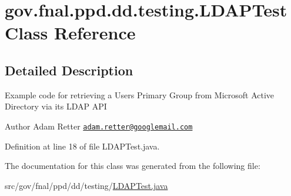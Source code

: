 \hypertarget{classgov_1_1fnal_1_1ppd_1_1dd_1_1testing_1_1LDAPTest}{\section{gov.\-fnal.\-ppd.\-dd.\-testing.\-L\-D\-A\-P\-Test Class Reference}
\label{classgov_1_1fnal_1_1ppd_1_1dd_1_1testing_1_1LDAPTest}
}


\subsection{Detailed Description}
Example code for retrieving a Users Primary Group from Microsoft Active Directory via its L\-D\-A\-P A\-P\-I

\begin{DoxyAuthor}{Author}
Adam Retter \href{mailto:adam.retter@googlemail.com}{\tt adam.\-retter@googlemail.\-com} 
\end{DoxyAuthor}


Definition at line 18 of file L\-D\-A\-P\-Test.\-java.



The documentation for this class was generated from the following file\-:\begin{DoxyCompactItemize}
\item 
src/gov/fnal/ppd/dd/testing/\hyperlink{LDAPTest_8java}{L\-D\-A\-P\-Test.\-java}\end{DoxyCompactItemize}
